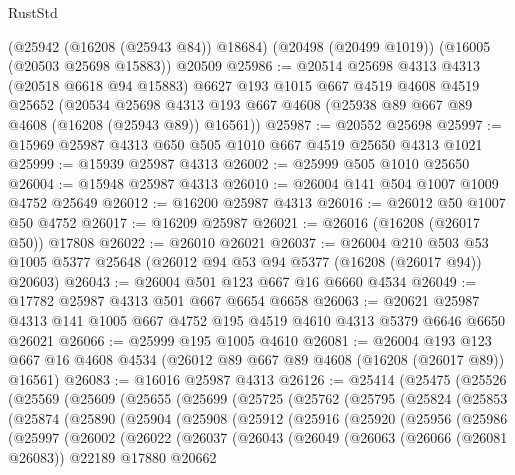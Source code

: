 \begin{lexlean}{RustStd}
\begin{coremodule}
    (@25942 (@16208 (@25943 @84)) @18684)
    (@20498 (@20499 @1019))
    (@16005 (@20503 @25698 @15883))
    @20509
@25986 := @20514
    @25698
    @4313
    @4313
    (@20518 @6618 @94 @15883)
    @6627
    @193
    @1015
    @667
    @4519
    @4608
    @4519
    @25652
    (@20534 @25698 @4313 @193 @667 @4608 (@25938 @89 @667 @89 @4608 (@16208 (@25943 @89)) @16561))
@25987 := @20552 @25698
@25997 := @15969 @25987 @4313 @650 @505 @1010 @667 @4519 @25650 @4313 @1021
@25999 := @15939 @25987 @4313
@26002 := @25999 @505 @1010 @25650
@26004 := @15948 @25987 @4313
@26010 := @26004 @141 @504 @1007 @1009 @4752 @25649
@26012 := @16200 @25987 @4313
@26016 := @26012 @50 @1007 @50 @4752
@26017 := @16209 @25987
@26021 := @26016 (@16208 (@26017 @50)) @17808
@26022 := @26010 @26021
@26037 := @26004
    @210
    @503
    @53
    @1005
    @5377
    @25648
    (@26012 @94 @53 @94 @5377 (@16208 (@26017 @94)) @20603)
@26043 := @26004 @501 @123 @667 @16 @6660 @4534
@26049 := @17782 @25987 @4313 @501 @667 @6654 @6658
@26063 := @20621 @25987 @4313 @141 @1005 @667 @4752 @195 @4519 @4610 @4313 @5379 @6646 @6650 @26021
@26066 := @25999 @195 @1005 @4610
@26081 := @26004
    @193
    @123
    @667
    @16
    @4608
    @4534
    (@26012 @89 @667 @89 @4608 (@16208 (@26017 @89)) @16561)
@26083 := @16016 @25987 @4313
@26126 := @25414
    (@25475
      (@25526
        (@25569
          (@25609
            (@25655
              (@25699
                (@25725
                  (@25762
                    (@25795
                      (@25824
                        (@25853
                          (@25874
                            (@25890
                              (@25904
                                (@25908
                                  (@25912
                                    (@25916
                                      (@25920
                                        (@25956
                                          (@25986
                                            (@25997
                                              (@26002
                                                (@26022
                                                  (@26037
                                                    (@26043
                                                      (@26049
                                                        (@26063
                                                          (@26066 (@26081 @26083))
                                                          @22189
                                                          @17880
                                                          @20662

\end{coremodule}
\end{lexlean}

